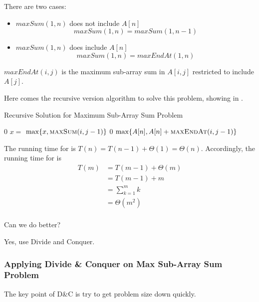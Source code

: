 There are two cases:

\begin{itemize}
    \item $maxSum(1, n)$ does not include $A[n]$
        \[maxSum(1, n) = maxSum(1, n-1)\]
    \item $maxSum(1, n)$ does include $A[n]$
        \[maxSum(1, n) = maxEndAt(1, n)\]
\end{itemize}

$maxEndAt(i, j)$ is the maximum sub-array sum in $A[i, j]$ restricted to include $A[j]$.

Here comes the recursive version algorithm to solve this problem, showing in .

\begin{algorithm}[H]
\caption{Recursive Solution for Maximum Sub-Array Sum Problem}\label{recur_max_sub_sum}
\begin{algorithmic}[1]
    \Return $0$
  \EndIf
  \State $x = $
  \Return $\max\{x, \textsc{maxSum} (i, j-1)\}$
\EndProcedure
{}
        \Return $0$
    \EndIf
    \Return $\max\{A[n], A[n] + \textsc{maxEndAt} (i, j-1)\}$
\EndProcedure
\end{algorithmic}
\end{algorithm}

The running time for  is $T(n) = T(n-1) + \Theta(1) = \Theta(n)$.
Accordingly, the running time for  is
\begin{align*}
    T(m) &= T(m-1) + \Theta(m) \\
         &= T(m-1) + m \\
         &= \sum_{k=1}^m k \\
         &= \Theta(m^2) \\
\end{align*}

Can we do better?

Yes, use Divide and Conquer.

\subsubsection{Applying Divide \& Conquer on Max Sub-Array Sum Problem}

The key point of D\&C is try to get problem size down quickly.


